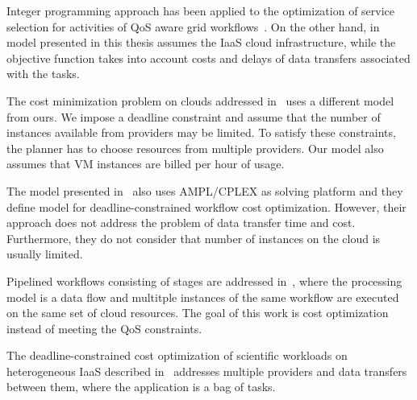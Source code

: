 Integer programming approach has been applied to the optimization of service selection for activities of QoS aware grid workflows~\cite{Brandic08}. On the other hand, in model presented in this thesis assumes the IaaS cloud infrastructure, while the objective function takes into account costs and delays of data transfers associated with the tasks.

The cost minimization problem on clouds addressed in~\cite{Pandey2010} uses a different model from ours. We impose a deadline constraint and assume that the number of instances available from providers may be limited. To satisfy these constraints, the planner has to choose resources from multiple providers. Our model also assumes that VM instances are billed per hour of usage.

The model presented in~\cite{Genez2012} also uses AMPL/CPLEX as solving platform and they define model for deadline-constrained workflow cost optimization. However, their approach does not address the problem of data transfer time and cost. Furthermore, they do not consider that number of instances on the cloud is usually limited. 

Pipelined workflows consisting of stages are addressed in~\cite{TolosanaCalasanz20121300}, where the processing model is a data flow and multitple instances of the same workflow are executed on the same set of cloud resources. The goal of this work is cost optimization instead of meeting the QoS constraints.

The deadline-constrained cost optimization of scientific workloads on heterogeneous IaaS described in~\cite{VandenBossche2013973} addresses multiple providers and data transfers between them, where the application is a bag of tasks.
